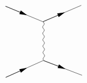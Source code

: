 \begin{equation}
    \begin{gathered}
        \begin{tikzpicture}[x=0.75pt,y=0.75pt,yscale=-1,xscale=1]
            \draw    (100.17,172.51) -- (131.95,158.32) ;
            \draw [shift={(133.77,157.5)}, rotate = 515.9300000000001] [fill={rgb, 255:red, 0; green, 0; blue, 0 }  ][line width=0.08]  [draw opacity=0] (12,-3) -- (0,0) -- (12,3) -- cycle    ;
            \draw    (100.17,172.51) -- (159.26,146.12) ;
            
            \draw    (160.29,146.04) .. controls (158.6,144.39) and (158.57,142.73) .. (160.22,141.04) .. controls (161.87,139.35) and (161.85,137.69) .. (160.16,136.04) .. controls (158.47,134.39) and (158.45,132.73) .. (160.1,131.04) .. controls (161.74,129.35) and (161.72,127.69) .. (160.03,126.04) .. controls (158.34,124.39) and (158.32,122.73) .. (159.97,121.04) .. controls (161.62,119.35) and (161.6,117.69) .. (159.91,116.04) .. controls (158.22,114.39) and (158.2,112.73) .. (159.84,111.04) .. controls (161.49,109.35) and (161.47,107.69) .. (159.78,106.04) .. controls (158.09,104.39) and (158.07,102.73) .. (159.72,101.04) .. controls (161.36,99.35) and (161.34,97.69) .. (159.65,96.04) .. controls (157.96,94.39) and (157.94,92.73) .. (159.59,91.04) .. controls (161.24,89.35) and (161.22,87.69) .. (159.53,86.04) -- (159.51,84.35) -- (159.51,84.35) ;
            \draw    (159.7,146.12) -- (192.38,158.57) ;
            \draw [shift={(194.25,159.28)}, rotate = 200.85] [fill={rgb, 255:red, 0; green, 0; blue, 0 }  ][line width=0.08]  [draw opacity=0] (12,-3) -- (0,0) -- (12,3) -- cycle    ;
            \draw    (159.7,146.12) -- (220.46,169.26) ;
            
            \draw    (99.72,60.8) -- (131.97,74.12) ;
            \draw [shift={(133.82,74.88)}, rotate = 202.44] [fill={rgb, 255:red, 0; green, 0; blue, 0 }  ][line width=0.08]  [draw opacity=0] (12,-3) -- (0,0) -- (12,3) -- cycle    ;
            \draw    (99.72,60.8) -- (159.69,85.57) ;
            
            \draw    (159.57,84.84) -- (191.65,71.2) ;
            \draw [shift={(193.49,70.41)}, rotate = 516.96] [fill={rgb, 255:red, 0; green, 0; blue, 0 }  ][line width=0.08]  [draw opacity=0] (12,-3) -- (0,0) -- (12,3) -- cycle    ;
            \draw    (159.57,84.84) -- (219.22,59.47) ;
            

\end{tikzpicture}
\end{gathered}
\end{equation}
